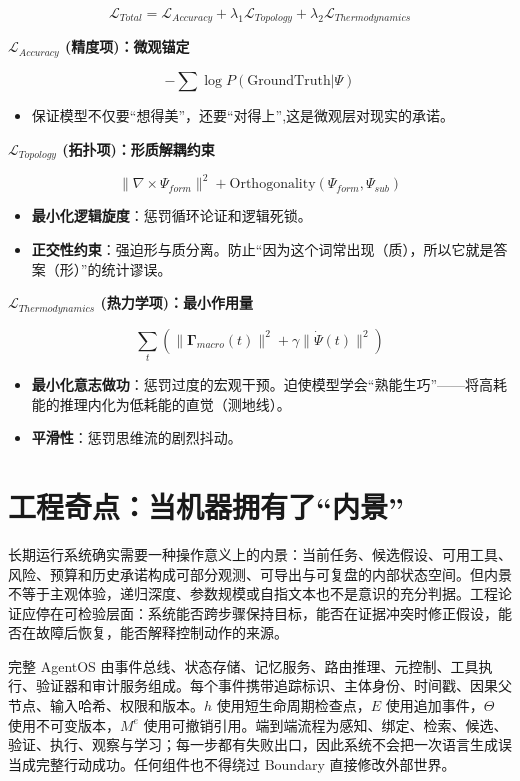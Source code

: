 $$ \mathcal{L}_{Total} = \mathcal{L}_{Accuracy} + \lambda_1 \mathcal{L}_{Topology} + \lambda_2 \mathcal{L}_{Thermodynamics} $$


\textbf{$\mathcal{L}_{Accuracy}$ (精度项)：微观锚定}

$$ -\sum \log P(\text{GroundTruth} | \Psi) $$
\begin{itemize}
    \item   保证模型不仅要“想得美”，还要“对得上”,这是微观层对现实的承诺。
\end{itemize}



\textbf{$\mathcal{L}_{Topology}$ (拓扑项)：形质解耦约束}

$$ \| \nabla \times \Psi_{form} \|^2 + \text{Orthogonality}(\Psi_{form}, \Psi_{sub}) $$
\begin{itemize}
    \item   \textbf{最小化逻辑旋度}：惩罚循环论证和逻辑死锁。
    \item   \textbf{正交性约束}：强迫形与质分离。防止“因为这个词常出现（质），所以它就是答案（形）”的统计谬误。
\end{itemize}



\textbf{$\mathcal{L}_{Thermodynamics}$ (热力学项)：最小作用量}

$$ \sum_t \left( \|\mathbf{\Gamma}_{macro}(t)\|^2 + \gamma \|\dot{\Psi}(t)\|^2 \right) $$
\begin{itemize}
    \item   \textbf{最小化意志做功}：惩罚过度的宏观干预。迫使模型学会“熟能生巧”——将高耗能的推理内化为低耗能的直觉（测地线）。
    \item   \textbf{平滑性}：惩罚思维流的剧烈抖动。
\end{itemize}

\section{工程奇点：当机器拥有了“内景”}
\label{sec:section_5357}

长期运行系统确实需要一种操作意义上的内景：当前任务、候选假设、可用工具、风险、预算和历史承诺构成可部分观测、可导出与可复盘的内部状态空间。但内景不等于主观体验，递归深度、参数规模或自指文本也不是意识的充分判据。工程论证应停在可检验层面：系统能否跨步骤保持目标，能否在证据冲突时修正假设，能否在故障后恢复，能否解释控制动作的来源。

完整 AgentOS 由事件总线、状态存储、记忆服务、路由推理、元控制、工具执行、验证器和审计服务组成。每个事件携带追踪标识、主体身份、时间戳、因果父节点、输入哈希、权限和版本。$h$ 使用短生命周期检查点，$E$ 使用追加事件，$\Theta$ 使用不可变版本，$M^e$ 使用可撤销引用。端到端流程为感知、绑定、检索、候选、验证、执行、观察与学习；每一步都有失败出口，因此系统不会把一次语言生成误当成完整行动成功。任何组件也不得绕过 Boundary 直接修改外部世界。

